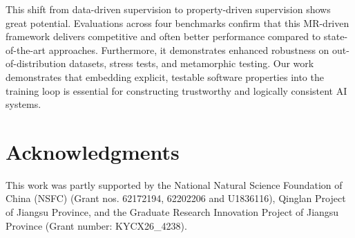 \documentclass[lettersize,journal]{IEEEtran}
\begin{document}
This shift from data-driven supervision to property-driven supervision shows great potential. Evaluations across four benchmarks confirm that this MR-driven framework delivers competitive and often better performance compared to state-of-the-art approaches. Furthermore, it demonstrates enhanced robustness on out-of-distribution datasets, stress tests, and metamorphic testing. Our work demonstrates that embedding explicit, testable software properties into the training loop is essential for constructing trustworthy and logically consistent AI systems.


\section*{Acknowledgments}
This work was partly supported by the National Natural Science
Foundation of China (NSFC) (Grant nos. 62172194, 62202206 and
U1836116), Qinglan Project of Jiangsu Province, and the Graduate Research
Innovation Project of Jiangsu Province (Grant number:
KYCX26\_4238).









 
\end{document}

